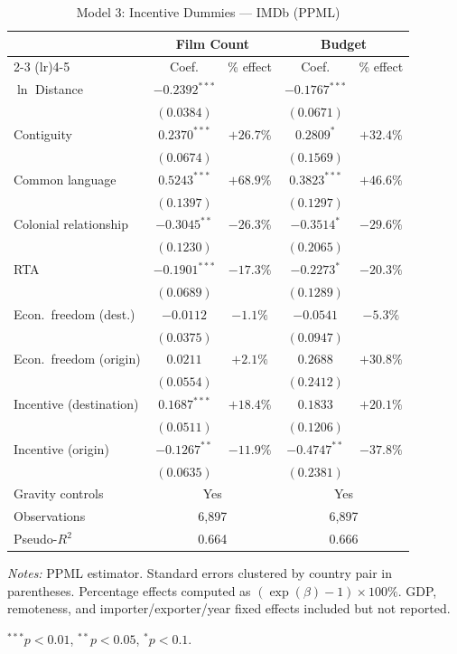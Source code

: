 \begin{table}[htbp]
\centering
\caption{Model 3: Incentive Dummies --- IMDb (PPML)}
\label{tab:model3}
\small
\begin{tabular}{l cc cc}
\toprule
 & \multicolumn{2}{c}{Film Count} & \multicolumn{2}{c}{Budget} \\
\cmidrule(lr){2-3} \cmidrule(lr){4-5}
 & Coef. & \% effect & Coef. & \% effect \\
\midrule
$\ln$ Distance & $-0.2392^{***}$ & & $-0.1767^{***}$ & \\
 & $(0.0384)$ & & $(0.0671)$ & \\[4pt]
Contiguity & $0.2370^{***}$ & $+26.7\%$ & $0.2809^{*}$ & $+32.4\%$ \\
 & $(0.0674)$ & & $(0.1569)$ & \\[4pt]
Common language & $0.5243^{***}$ & $+68.9\%$ & $0.3823^{***}$ & $+46.6\%$ \\
 & $(0.1397)$ & & $(0.1297)$ & \\[4pt]
Colonial relationship & $-0.3045^{**}$ & $-26.3\%$ & $-0.3514^{*}$ & $-29.6\%$ \\
 & $(0.1230)$ & & $(0.2065)$ & \\[4pt]
RTA & $-0.1901^{***}$ & $-17.3\%$ & $-0.2273^{*}$ & $-20.3\%$ \\
 & $(0.0689)$ & & $(0.1289)$ & \\[4pt]
Econ.\ freedom (dest.) & $-0.0112$ & $-1.1\%$ & $-0.0541$ & $-5.3\%$ \\
 & $(0.0375)$ & & $(0.0947)$ & \\[4pt]
Econ.\ freedom (origin) & $0.0211$ & $+2.1\%$ & $0.2688$ & $+30.8\%$ \\
 & $(0.0554)$ & & $(0.2412)$ & \\[4pt]
Incentive (destination) & $0.1687^{***}$ & $+18.4\%$ & $0.1833$ & $+20.1\%$ \\
 & $(0.0511)$ & & $(0.1206)$ & \\[4pt]
Incentive (origin) & $-0.1267^{**}$ & $-11.9\%$ & $-0.4747^{**}$ & $-37.8\%$ \\
 & $(0.0635)$ & & $(0.2381)$ & \\[4pt]
\midrule
Gravity controls & \multicolumn{2}{c}{Yes} & \multicolumn{2}{c}{Yes} \\
Observations & \multicolumn{2}{c}{6,897} & \multicolumn{2}{c}{6,897} \\
Pseudo-$R^2$ & \multicolumn{2}{c}{0.664} & \multicolumn{2}{c}{0.666} \\
\bottomrule
\end{tabular}
\par\vspace{4pt}\noindent\begin{minipage}{\textwidth}
\footnotesize
\par \textit{Notes:} PPML estimator. Standard errors clustered by country pair in parentheses. Percentage effects computed as $(\exp(\beta)-1) \times 100\%$. GDP, remoteness, and importer/exporter/year fixed effects included but not reported.
\par $^{***}p<0.01$, $^{**}p<0.05$, $^{*}p<0.1$.
\end{minipage}
\end{table}

